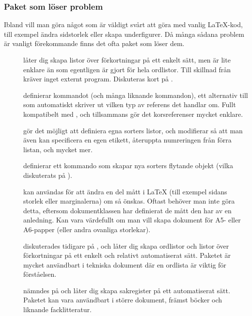 \documentclass[lang=sv,ptsize=10pt,font=none,nomath,titles=bf,../../a4.tex]{subfiles}
\begin{document}
\subsubsection{Paket som löser problem}
Ibland vill man göra något som är väldigt svårt att göra med vanlig
\LaTeX-kod, till exempel ändra sidstorlek eller skapa underfigurer. Då
många sådana problem är vanligt förekommande finns det ofta paket som
löser dem.

\begin{description}
	\item[]
	låter dig skapa listor över förkortningar på ett enkelt sätt, men är
	lite enklare än  som egentligen är gjort för hela
	ordlistor. Till skillnad från  kräver 
	inget externt program. Diskuteras kort på .

	\item[]
	definierar kommandot  (och många liknande kommandon), ett
	alternativ till  som automatiskt skriver ut vilken typ av
	referens det handlar om. Fullt kompatibelt med , och
	tillsammans gör det korsreferenser mycket enklare.

	\item[]
	gör det möjligt att definiera egna sorters listor, och modifierar 
		så att man även kan specificera en egen etikett, återuppta
	numreringen från förra listan, och mycket mer.
	
	\item[]
	definierar ett kommando  som skapar nya sorters flytande
	objekt (vilka diskuterats på ).
	
	\item[]
	kan användas för att ändra en del mått i \LaTeX{} (till exempel sidans
	storlek eller marginalerna) om så önskas. Oftast behöver man inte göra
	detta, eftersom dokumentklassen har definierat de mått den har av en
	anledning. Kan vara värdefullt om man vill skapa dokument för A5-%
	eller A6-papper (eller andra ovanliga storlekar).

	\item[]
	diskuterades tidigare på , och låter
	dig skapa ordlistor och listor över förkortningar på ett enkelt
	och relativt automatiserat sätt. Paketet är mycket användbart i
	tekniska dokument där en ordlista är viktig för förståelsen.

	\item[]
	nämndes på  och låter dig skapa sakregister
	på ett automatiserat sätt. Paketet kan vara användbart i större
	dokument, främst böcker och liknande facklitteratur.


\end{description}
\end{document}
